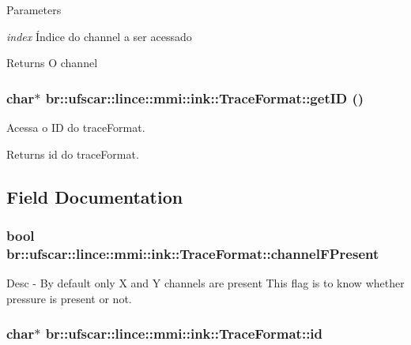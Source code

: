 \begin{DoxyParams}{Parameters}
\item[{\em index}]Índice do channel a ser acessado \end{DoxyParams}
\begin{DoxyReturn}{Returns}
O channel 
\end{DoxyReturn}
\hypertarget{classbr_1_1ufscar_1_1lince_1_1mmi_1_1ink_1_1TraceFormat_afc72b9eb02901fb2a58c159b73231c6a}{
\subsubsection[{getID}]{\setlength{\rightskip}{0pt plus 5cm}char$\ast$ br::ufscar::lince::mmi::ink::TraceFormat::getID ()}}
\label{classbr_1_1ufscar_1_1lince_1_1mmi_1_1ink_1_1TraceFormat_afc72b9eb02901fb2a58c159b73231c6a}


Acessa o ID do traceFormat. 

\begin{DoxyReturn}{Returns}
id do traceFormat. 
\end{DoxyReturn}


\subsection{Field Documentation}
\hypertarget{classbr_1_1ufscar_1_1lince_1_1mmi_1_1ink_1_1TraceFormat_ab503ce06d24067ab5f7611793116160e}{
\subsubsection[{channelFPresent}]{\setlength{\rightskip}{0pt plus 5cm}bool {\bf br::ufscar::lince::mmi::ink::TraceFormat::channelFPresent}}}
\label{classbr_1_1ufscar_1_1lince_1_1mmi_1_1ink_1_1TraceFormat_ab503ce06d24067ab5f7611793116160e}


Desc -\/ By default only X and Y channels are present This flag is to know whether pressure is present or not. 

\hypertarget{classbr_1_1ufscar_1_1lince_1_1mmi_1_1ink_1_1TraceFormat_ad89fcbbb40fb5691df020fa57b325f44}{
\subsubsection[{id}]{\setlength{\rightskip}{0pt plus 5cm}char$\ast$ {\bf br::ufscar::lince::mmi::ink::TraceFormat::id}}}
\label{classbr_1_1ufscar_1_1lince_1_1mmi_1_1ink_1_1TraceFormat_ad89fcbbb40fb5691df020fa57b325f44}


